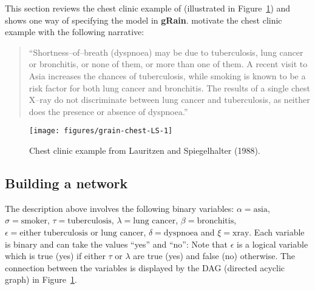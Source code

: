\documentclass[10pt]{article}\usepackage[]{graphicx}\usepackage[]{color}
\makeatletter
\def\maxwidth{ %
  \ifdim\Gin@nat@width>\linewidth
    \linewidth
  \else
    \Gin@nat@width
  \fi
}
\newenvironment{knitrout}{}{} %
\def\grbn{{\bf gRain}}
\makeatother
\begin{document}
This section reviews the chest clinic example of \cite{lau/spieg:88}
(illustrated in Figure~\ref{fig:chest-LS}) and shows one way of
specifying the model in \grbn{}.  \cite{lau/spieg:88} motivate the
chest clinic example with the following narrative:

\begin{quote}
  ``Shortness--of--breath (dyspnoea) may be due to tuberculosis, lung
  cancer or bronchitis, or none of them, or more than one of them. A
  recent visit to Asia increases the chances of tuberculosis, while
  smoking is known to be a risk factor for both lung cancer and
  bronchitis. The results of a single chest X--ray do not discriminate
  between lung cancer and tuberculosis, as neither does the presence or
  absence of dyspnoea.''
\end{quote}


\begin{knitrout}
\color{fgcolor}\begin{figure}
\texttt{[image: figures/grain-chest-LS-1]} \caption[Chest clinic example from Lauritzen and Spiegelhalter (1988)]{Chest clinic example from Lauritzen and Spiegelhalter (1988).}\label{fig:chest-LS}
\end{figure}


\end{knitrout}

\subsection{Building a network}

The description above involves the following binary variables:
$\alpha=\mbox{asia}$,
$\sigma=\mbox{smoker}$,
$\tau=\mbox{tuberculosis}$,
$\lambda=\mbox{lung cancer}$,
$\beta=\mbox{bronchitis}$,
$\epsilon=\mbox{either tuberculosis or lung cancer}$,
$\delta=\mbox{dyspnoea}$ and
$\xi=\mbox{xray}$. 
Each variable is binary and can take the values ``yes'' and ``no'':
Note that $\epsilon$ is a logical variable which is
true (yes) if either $\tau$ or $\lambda$ are true (yes) and false (no) otherwise.
The connection between the variables is displayed by the DAG (directed acyclic graph) in
Figure~\ref{fig:chest-LS}.
\end{document}
